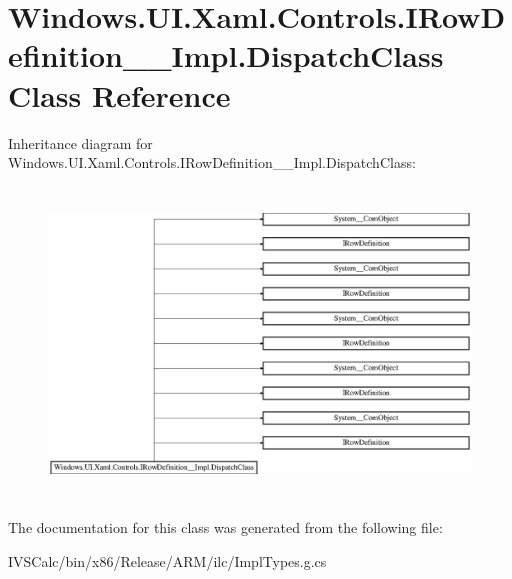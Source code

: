 \hypertarget{class_windows_1_1_u_i_1_1_xaml_1_1_controls_1_1_i_row_definition_____impl_1_1_dispatch_class}{}\section{Windows.\+U\+I.\+Xaml.\+Controls.\+I\+Row\+Definition\+\_\+\+\_\+\+Impl.\+Dispatch\+Class Class Reference}
\label{class_windows_1_1_u_i_1_1_xaml_1_1_controls_1_1_i_row_definition_____impl_1_1_dispatch_class}
Inheritance diagram for Windows.\+U\+I.\+Xaml.\+Controls.\+I\+Row\+Definition\+\_\+\+\_\+\+Impl.\+Dispatch\+Class\+:\begin{figure}[H]
\begin{center}
\leavevmode
\includegraphics[height=8.279570cm]{class_windows_1_1_u_i_1_1_xaml_1_1_controls_1_1_i_row_definition_____impl_1_1_dispatch_class}
\end{center}
\end{figure}


The documentation for this class was generated from the following file\+:\begin{DoxyCompactItemize}
\item 
I\+V\+S\+Calc/bin/x86/\+Release/\+A\+R\+M/ilc/Impl\+Types.\+g.\+cs\end{DoxyCompactItemize}
